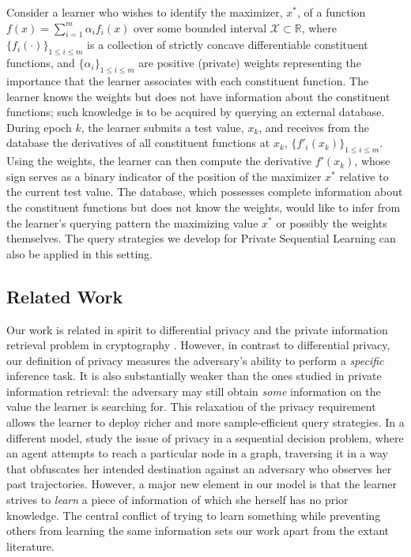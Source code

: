 \documentclass[final,12pt]{colt2018}
\def\R{\mathbb{R}}
\def\calX{\mathcal{X}}
\def\calX{\mathcal{X}}
\begin{document}
Consider a {learner} who wishes to identify the maximizer, $x^*$, of a function $f(x) = \sum_{i=1}^m \alpha_i f_i(x)$ over some bounded interval $\calX \subset \R$, where $\{f_i(\cdot)\}_{1\leq i \leq m}$ is a collection of strictly concave differentiable constituent functions, and $\{\alpha_i\}_{1\leq i \leq m}$ are positive (private) weights representing the importance that the {learner} associates with each constituent function. The {learner} knows the weights but does not have information about the constituent functions; such knowledge is to be acquired by querying an external database. During epoch $k$, the {learner} submits a test value, $x_k$, and receives from the database the derivatives of all constituent functions at $x_k$, $\{f'_i(x_k)\}_{1\leq i \leq m}$. Using the weights, the {learner} can then compute the derivative $f'(x_k)$, whose sign serves as a binary indicator of the position of the maximizer $x^*$ relative to the current test value. The database, which possesses complete information about the constituent functions but does not know the weights, would like to infer from the {learner}'s querying pattern the maximizing value $x^*$ or possibly the weights themselves. The query strategies we develop for {Private Sequential Learning} can also be applied in this setting.


\subsection{Related Work}
{Our work is related in spirit to differential privacy \citep{dwork2008differential,dwork2014algorithmic} and the private information retrieval problem in cryptography \citep{kushilevitz1997replication,chor1998private,gasarch2004survey}. However, in contrast to differential privacy, our definition of privacy measures the adversary's ability to perform a \emph{specific} inference task. It is also substantially weaker than the ones studied in private information retrieval: the adversary may still obtain \emph{some} information on the value the learner is searching for. This relaxation of the privacy requirement allows the {learner} to deploy richer and more sample-efficient query strategies. In a different model, \cite{kuang} study the issue of privacy in a sequential decision problem, where an agent attempts to reach a particular node in a graph, traversing it in a way that obfuscates her intended destination against an adversary who observes her past trajectories. However, a major new element in our model is that the {learner} strives to \emph{learn} a piece of information of which she herself has no prior knowledge. The central conflict of trying to learn something while preventing others from learning the same information sets our work apart from the extant literature. }
\end{document}
